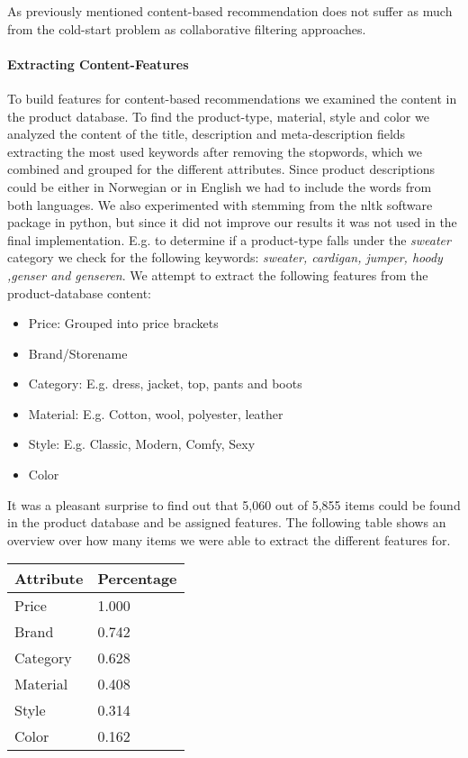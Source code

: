 As previously mentioned content-based recommendation does not suffer as much from the cold-start problem as
collaborative filtering approaches. 

\paragraph{Extracting Content-Features}

To build features for content-based recommendations we examined the content in the product database. To find the product-type, material, style and color we analyzed the content of the title, description and meta-description fields extracting the most used keywords after removing the stopwords, which we combined and grouped for the different attributes. Since product descriptions could be either in Norwegian or in English we had to include the words from both languages. We also experimented with stemming from the nltk software package in python, but since it did not improve our results it was not used in the final implementation. E.g. to determine if a product-type falls under the \emph{sweater} category we check for the following keywords: \emph{sweater, cardigan, jumper, hoody ,genser and genseren}. We attempt to extract the following features from the product-database content:

\begin{itemize}
\item Price: Grouped into price brackets
\item Brand/Storename
\item Category: E.g. dress, jacket, top, pants and boots
\item Material: E.g. Cotton, wool, polyester, leather
\item Style: E.g. Classic, Modern, Comfy, Sexy
\item Color
\end{itemize}

It was a pleasant surprise to find out that 5,060 out of 5,855 items could be found in the
product database and be assigned features. The following table shows an overview over how many items we were able to extract the different features for.

\begin{table}[H]
	\centering
	\begin{tabular}{l l}
	\toprule
	Attribute & Percentage  \\ \midrule
	Price 			& 1.000 \\ 
	Brand 			& 0.742 \\ 
	Category 		& 0.628 \\ 
	Material 		& 0.408 \\ 
	Style 			& 0.314 \\ 
	Color 			& 0.162
	\\ \bottomrule
	\end{tabular}
\end{table}

